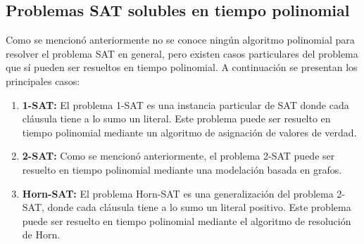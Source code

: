 \documentclass[12pt]{article}
\begin{document}
\subsection{Problemas SAT solubles en tiempo polinomial}

Como se mencionó anteriormente no se conoce ningún algoritmo polinomial para resolver el problema SAT en general, pero
existen casos particulares del problema que sí pueden ser resueltos en tiempo polinomial. A continuación se presentan los
principales casos:

\begin{enumerate}
      \item \textbf{1-SAT:} El problema 1-SAT es una instancia particular de SAT donde cada cláusula tiene a lo sumo un literal.
            Este problema puede ser resuelto en tiempo polinomial mediante un algoritmo de asignación de valores de verdad.
      \item \textbf{2-SAT:} Como se mencionó anteriormente, el problema 2-SAT puede ser resuelto en tiempo polinomial mediante
            una modelación basada en grafos.
      \item \textbf{Horn-SAT:} El problema Horn-SAT es una generalización del problema 2-SAT, donde cada cláusula tiene a lo sumo
            un literal positivo. Este problema puede ser resuelto en tiempo polinomial mediante el algoritmo de resolución de Horn.
\end{enumerate}
\end{document}
